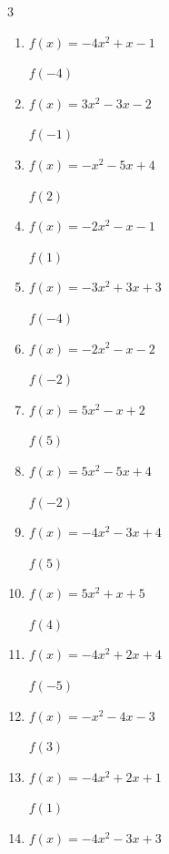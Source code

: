 \begin{multicols}{3}
\begin{enumerate}
$f(1)$
        \phantom{$= 4$}

  \item $f(x)=-4x^{2}+x-1$

$f(-4)$
        \phantom{$= -69$}

  \item $f(x)=3x^{2}-3x-2$

$f(-1)$
        \phantom{$= 4$}

  \item $f(x)=-x^{2}-5x+4$

$f(2)$
        \phantom{$= -10$}

  \item $f(x)=-2x^{2}-x-1$

$f(1)$
        \phantom{$= -4$}

  \item $f(x)=-3x^{2}+3x+3$

$f(-4)$
        \phantom{$= -57$}

  \item $f(x)=-2x^{2}-x-2$

$f(-2)$
        \phantom{$= -8$}

  \item $f(x)=5x^{2}-x+2$

$f(5)$
        \phantom{$= 122$}

  \item $f(x)=5x^{2}-5x+4$

$f(-2)$
        \phantom{$= 34$}

\columnbreak %

  \item $f(x)=-4x^{2}-3x+4$

$f(5)$
        \phantom{$= -111$}

  \item $f(x)=5x^{2}+x+5$

$f(4)$
        \phantom{$= 89$}

  \item $f(x)=-4x^{2}+2x+4$

$f(-5)$
        \phantom{$= -106$}

  \item $f(x)=-x^{2}-4x-3$

$f(3)$
        \phantom{$= -24$}

  \item $f(x)=-4x^{2}+2x+1$

$f(1)$
        \phantom{$= -1$}

  \item $f(x)=-4x^{2}-3x+3$


\end{enumerate}
\end{multicols}
